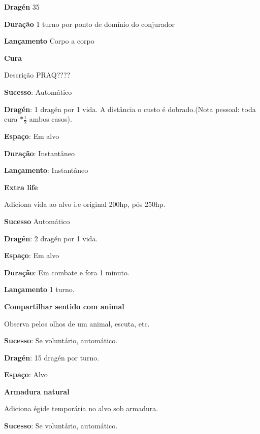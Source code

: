 \textbf{Dragén} 35


\textbf{Duração} 1 turno por ponto de domínio do conjurador

\textbf{Lançamento} Corpo a corpo
\bigskip

\textbf{Cura}

Descrição PRAQ????

\textbf{Sucesso}: Automático

\textbf{Dragén}: 1 dragén por 1 vida. A distância o custo é dobrado.(Nota pessoal: toda cura $*\frac{1}{2}$ ambos casos).

\textbf{Espaço}: Em alvo

\textbf{Duração}: Instantâneo

\textbf{Lançamento}: Instantâneo
\bigskip

\textbf{Extra life}

Adiciona vida ao alvo i.e original 200hp, pós 250hp.

\textbf{Sucesso} Automático

\textbf{Dragén}: 2 dragén por 1 vida.

\textbf{Espaço}: Em alvo

\textbf{Duração}: Em combate e fora 1 minuto.

\textbf{Lançamento} 1 turno.
\bigskip


\textbf{Compartilhar sentido com animal}

Observa pelos olhos de um animal, escuta, etc. 

\textbf{Sucesso}: Se voluntário, automático.

\textbf{Dragén}: 15 dragén por turno.

\textbf{Espaço}: Alvo


\bigskip

\textbf{Armadura natural}

Adiciona égide temporária no alvo sob armadura. 

\textbf{Sucesso}: Se voluntário, automático.

